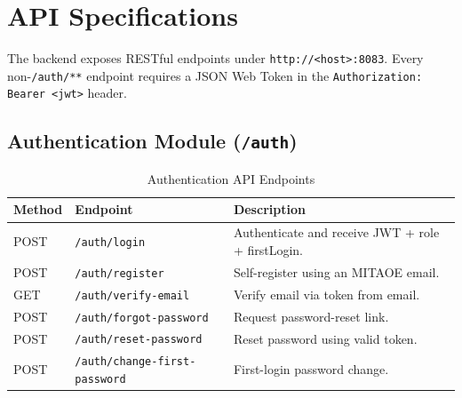 \newpage

\section{API Specifications}
The backend exposes RESTful endpoints under \texttt{http://<host>:8083}. Every non-\texttt{/auth/**} endpoint requires a JSON Web Token in the \texttt{Authorization: Bearer <jwt>} header.

\subsection{Authentication Module (\texttt{/auth})}
\begin{table}[H]
    \centering
    \renewcommand{\arraystretch}{1.4}
    \begin{tabular}{|p{1.8cm}|p{5.3cm}|p{6.5cm}|}
        \hline
        \textbf{Method} & \textbf{Endpoint} & \textbf{Description} \\
        \hline
        POST & \texttt{/auth/login} & Authenticate and receive JWT + role + firstLogin. \\
        \hline
        POST & \texttt{/auth/register} & Self-register using an MITAOE email. \\
        \hline
        GET & \texttt{/auth/verify-email} & Verify email via token from email. \\
        \hline
        POST & \texttt{/auth/forgot-password} & Request password-reset link. \\
        \hline
        POST & \texttt{/auth/reset-password} & Reset password using valid token. \\
        \hline
        POST & \texttt{/auth/change-first-password} & First-login password change. \\
        \hline
    \end{tabular}
    \caption{Authentication API Endpoints}
    \label{tab:api_auth}
\end{table}

